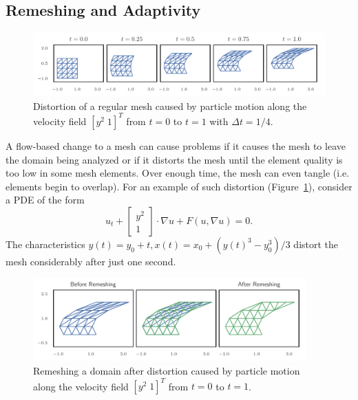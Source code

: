 \subsection{Remeshing and Adaptivity}

\begin{figure}
  \includegraphics{../images/curved-mesh/mesh_distortion.pdf}
  \centering
  \captionsetup{width=.75\linewidth}
  \caption{Distortion of a regular mesh caused by particle motion along
    the velocity field \(\left[ y^2 \; 1 \right]^T\) from \(t = 0\)
    to \(t = 1\) with \(\Delta t = 1/4\).}
  \label{fig:mesh-distortion}
\end{figure}

A flow-based change to a mesh can cause problems if it causes the mesh to
leave the domain being analyzed or if it distorts the mesh until the element
quality is too low in some mesh elements. Over enough time, the mesh can
even tangle (i.e. elements begin to overlap).
For an example of such distortion (Figure~\ref{fig:mesh-distortion}),
consider a PDE of the form
\begin{equation}\label{eq:non-rigid-characteristics}
u_t + \left[ \begin{array}{c} y^2 \\ 1 \end{array}\right] \cdot \nabla u +
  F\left(u, \nabla u\right) = 0.
\end{equation}
The characteristics \(y(t) = y_0 + t, x(t) = x_0 +
\left(y(t)^3 - y_0^3\right)/3\)
distort the mesh considerably after just one second.

\begin{figure}
  \includegraphics[width=0.9375\textwidth]
                  {../images/curved-mesh/distortion_remesh.pdf}
  \centering
  \captionsetup{width=.75\linewidth}
  \caption{Remeshing a domain after distortion caused by particle motion
    along the velocity field \(\left[ y^2 \; 1 \right]^T\) from \(t = 0\)
    to \(t = 1\).}
  \label{fig:distortion-remesh}
\end{figure}


